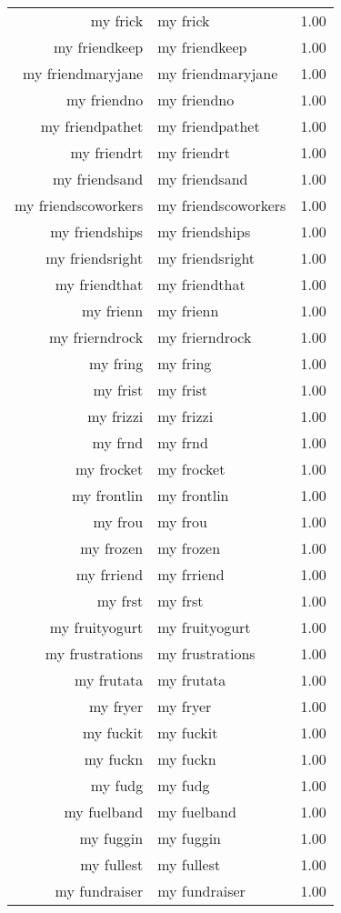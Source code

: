 \begin{table}[ht]
\begin{tabular}{rlr}
  my frick & my frick & 1.00 \\ 
  my friendkeep & my friendkeep & 1.00 \\ 
  my friendmaryjane & my friendmaryjane & 1.00 \\ 
  my friendno & my friendno & 1.00 \\ 
  my friendpathet & my friendpathet & 1.00 \\ 
  my friendrt & my friendrt & 1.00 \\ 
  my friendsand & my friendsand & 1.00 \\ 
  my friendscoworkers & my friendscoworkers & 1.00 \\ 
  my friendships & my friendships & 1.00 \\ 
  my friendsright & my friendsright & 1.00 \\ 
  my friendthat & my friendthat & 1.00 \\ 
  my frienn & my frienn & 1.00 \\ 
  my frierndrock & my frierndrock & 1.00 \\ 
  my fring & my fring & 1.00 \\ 
  my frist & my frist & 1.00 \\ 
  my frizzi & my frizzi & 1.00 \\ 
  my frnd & my frnd & 1.00 \\ 
  my frocket & my frocket & 1.00 \\ 
  my frontlin & my frontlin & 1.00 \\ 
  my frou & my frou & 1.00 \\ 
  my frozen & my frozen & 1.00 \\ 
  my frriend & my frriend & 1.00 \\ 
  my frst & my frst & 1.00 \\ 
  my fruityogurt & my fruityogurt & 1.00 \\ 
  my frustrations & my frustrations & 1.00 \\ 
  my frutata & my frutata & 1.00 \\ 
  my fryer & my fryer & 1.00 \\ 
  my fuckit & my fuckit & 1.00 \\ 
  my fuckn & my fuckn & 1.00 \\ 
  my fudg & my fudg & 1.00 \\ 
  my fuelband & my fuelband & 1.00 \\ 
  my fuggin & my fuggin & 1.00 \\ 
  my fullest & my fullest & 1.00 \\ 
  my fundraiser & my fundraiser & 1.00 \\ 

\end{tabular}
\end{table}
